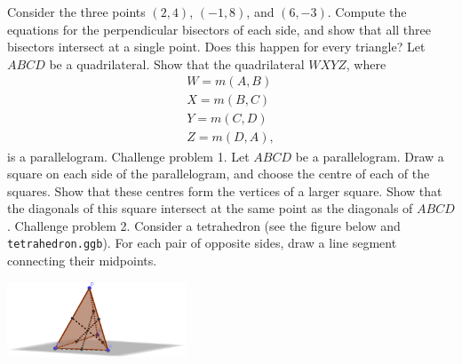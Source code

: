 \begin{questions}
  \question Consider the three points $ (2,4) $, $ (-1,8) $, and $ (6,-3) $. Compute the equations
            for the perpendicular bisectors of each side, and show that all three bisectors intersect
            at a single point. Does this happen for every triangle?
  \question Let $ ABCD $ be a quadrilateral. Show that the quadrilateral $ WXYZ $, where
            \begin{gather*}
              W = m(A,B)\\
              X = m(B,C)\\
              Y = m(C,D)\\
              Z = m(D,A),
            \end{gather*}
            is a parallelogram.
  \clearpage
  \question Challenge problem 1. Let $ ABCD $ be a parallelogram. Draw a square on each side of the parallelogram, and choose
            the centre of each of the squares. Show that these centres form the vertices of a larger square. Show that the diagonals
            of this square intersect at the same point as the diagonals of $ ABCD $.
  \question Challenge problem 2. Consider a tetrahedron (see the figure below and \texttt{tetrahedron.ggb}). For each pair of opposite sides, draw
            a line segment connecting their midpoints.
            \begin{center}
              \includegraphics[width=0.4\textwidth]{tetrahedron}
            \end{center}
\end{questions}


